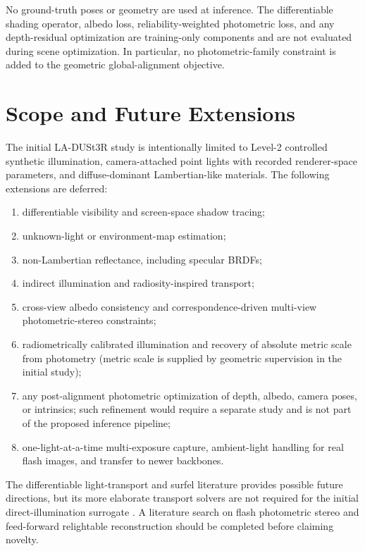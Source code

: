 \documentclass[11pt,a4paper]{article}
\begin{document}
No ground-truth poses or geometry are used at inference. The differentiable
shading operator, albedo loss, reliability-weighted photometric loss, and
any depth-residual optimization are training-only components and are not
evaluated during scene optimization. In particular, no photometric-family
constraint is added to the geometric global-alignment objective.

\section{Scope and Future Extensions}

The initial LA-DUSt3R study is intentionally limited to Level-2 controlled
synthetic illumination, camera-attached point lights with recorded
renderer-space parameters, and diffuse-dominant Lambertian-like materials.
The following extensions are deferred:
\begin{enumerate}
  \item differentiable visibility and screen-space shadow tracing;
  \item unknown-light or environment-map estimation;
  \item non-Lambertian reflectance, including specular BRDFs;
  \item indirect illumination and radiosity-inspired transport;
  \item cross-view albedo consistency and correspondence-driven
  multi-view photometric-stereo constraints;
  \item radiometrically calibrated illumination and recovery of absolute
  metric scale from photometry (metric scale is supplied by geometric
  supervision in the initial study);
  \item any post-alignment photometric optimization of depth, albedo, camera
  poses, or intrinsics; such refinement would require a separate study and
  is not part of the proposed inference pipeline;
  \item one-light-at-a-time multi-exposure capture, ambient-light handling
  for real flash images, and transfer to newer backbones.
\end{enumerate}
The differentiable light-transport and surfel literature provides
possible future directions, but its more elaborate transport solvers are
not required for the initial direct-illumination surrogate
\cite{gjerde2026point,jiang2025radiositygs}. A literature search on flash
photometric stereo and feed-forward relightable reconstruction should be
completed before claiming novelty.
\end{document}
